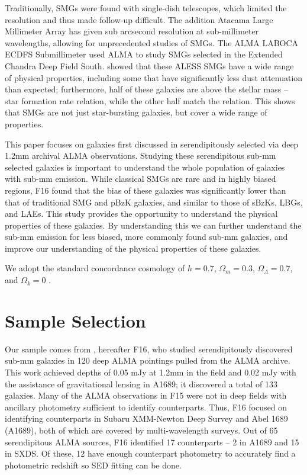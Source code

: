 \documentclass[preprint,natbib209]{aastex}
\begin{document}
Traditionally, SMGs were found with single-dish telescopes, which limited the resolution and thus made follow-up difficult. The addition Atacama Large Millimeter Array has given sub arcsecond resolution at sub-millimeter wavelengths, allowing for unprecedented studies of SMGs. The ALMA LABOCA ECDFS Submillimeter \citep[ALESS;][]{hodge13} used ALMA to study SMGs selected in the Extended Chandra Deep Field South. \cite{dacunha15} showed that these ALESS SMGs have a wide range of physical properties, including some that have significantly less dust attenuation than expected; furthermore, half of these galaxies are above the stellar mass -- star formation rate relation, while the other half match the relation. This shows that SMGs are not just star-bursting galaxies, but cover a wide range of properties.

This paper focuses on galaxies first discussed in \cite{fujimoto16} serendipitously selected via deep 1.2mm archival ALMA observations. 
Studying these serendipitous sub-mm selected galaxies is important to understand the whole population of galaxies with sub-mm emission.
While classical SMGs are rare and in highly biased regions, F16 found that the bias of these galaxies was significantly lower than that of traditional SMG and pBzK galaxies, and similar to those of sBzKs, LBGs, and LAEs. This study provides the opportunity to understand the physical properties of these galaxies. By understanding this we can further understand the sub-mm emission for less biased, more commonly found sub-mm galaxies, and improve our understanding of the physical properties of these galaxies.

We adopt the standard concordance cosmology of $h = 0.7$, $\Omega_m = 0.3$, $\Omega_\Lambda = 0.7$, 
and $\Omega_k = 0$ \citep{planck13}.

\section{Sample Selection} 
\label{sec:sample}

Our sample comes from \citet{fujimoto16}, hereafter F16, who studied serendipitously discovered sub-mm galaxies in 
120 deep ALMA pointings pulled from the ALMA archive. This work achieved depths of 0.05 mJy at 1.2mm in the field and 0.02 mJy 
with the assistance of gravitational lensing in A1689; it discovered a total of 133 galaxies. Many of the ALMA observations in F15 were not
in deep fields with ancillary photometry sufficient to identify counterparts. Thus, F16 focused on identifying counterparts in Subaru XMM-Newton Deep 
Survey \citep[SXDS;][]{furusawa08} and Abel 1689 (A1689), both of which are covered by multi-wavelength surveys. 
Out of 65 serendipitous ALMA sources, F16 identified 17 counterparts -- 2 in A1689 and 15 in SXDS. Of these, 12 have enough counterpart photometry to accurately find a photometric redshift so SED fitting can be done.
\end{document}
